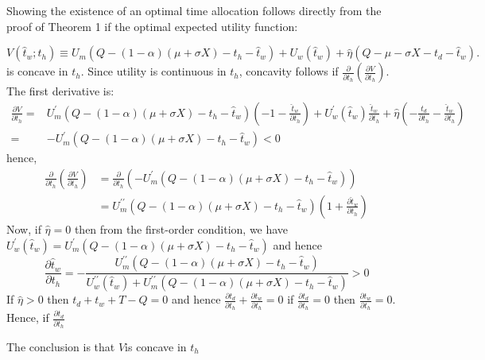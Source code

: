 \documentclass[12pt,a4paper,british]{article}
\theoremstyle{definition}
\theoremstyle{plain}
\theoremstyle{plain}
\begin{document}
Showing the existence of an optimal time allocation follows directly from the proof of Theorem 1 if the optimal expected utility function:

\begin{equation*}
V\left(\hat{t}_{w};t_{h}\right)\equiv U_{m}\left(Q-\left(1-\alpha\right)\left(\mu+\sigma X\right)-t_{h}-\hat{t}_{w}\right)+U_{w}\left(\hat{t}_{w}\right)+\hat{\eta}\left(Q-\mu-\sigma X-t_{d}-\hat{t}_{w}\right).
\end{equation*}%
is concave in $t_{h}$. Since utility is continuous in $t_{h}$, concavity follows if $\frac{\partial}{\partial t_{h}}\left(\frac{\partial V}{\partial t_{h}}\right)$. The first derivative is:
\begin{align*}
\frac{\partial V}{\partial t_{h}}= & U_{m}^{\prime}\left(Q-\left(1-\alpha\right)\left(\mu+\sigma X\right)-t_{h}-\hat{t}_{w}\right)\left(-1-\frac{\hat{t}_{w}}{\partial t_{h}}\right)+U_{w}^{\prime}\left(\hat{t}_{w}\right)\frac{\hat{t}_{w}}{\partial t_{h}}+\hat{\eta}\left(-\frac{t_{d}}{\partial t_{h}}-\frac{\hat{t}_{w}}{\partial t_{h}}\right)\\
= & -U_{m}^{\prime}\left(Q-\left(1-\alpha\right)\left(\mu+\sigma X\right)-t_{h}-\hat{t}_{w}\right)<0
\end{align*}
hence,
\begin{align*}
\frac{\partial}{\partial t_{h}}\left(\frac{\partial V}{\partial t_{h}}\right) & =\frac{\partial}{\partial t_{h}}\left(-U_{m}^{\prime}\left(Q-\left(1-\alpha\right)\left(\mu+\sigma X\right)-t_{h}-\hat{t}_{w}\right)\right)\\
 & =U_{m}^{\prime\prime}\left(Q-\left(1-\alpha\right)\left(\mu+\sigma X\right)-t_{h}-\hat{t}_{w}\right)\left(1+\frac{\partial\hat{t}_{w}}{\partial t_{h}}\right)
\end{align*}
Now, if $\hat{\eta}=0$ then from the first-order condition, we have $U_{w}^{\prime}\left(\hat{t}_{w}\right)=U_{m}^{\prime}\left(Q-\left(1-\alpha\right)\left(\mu+\sigma X\right)-t_{h}-\hat{t}_{w}\right)$ and hence
\begin{equation*}
\frac{\partial\hat{t}_{w}}{\partial t_{h}}=-\frac{U_{m}^{\prime\prime}\left(Q-\left(1-\alpha\right)\left(\mu+\sigma X\right)-t_{h}-\hat{t}_{w}\right)}{U_{w}^{\prime\prime}\left(\hat{t}_{w}\right)+U_{m}^{\prime\prime}\left(Q-\left(1-\alpha\right)\left(\mu+\sigma X\right)-t_{h}-\hat{t}_{w}\right)}>0
\end{equation*}
If $\hat{\eta}>0$ then $t_{d}+t_{w}+T-Q=0$ and hence $\frac{\partial t_{d}}{\partial t_{h}}+\frac{\partial t_{w}}{\partial t_{h}}=0$ if $\frac{\partial t_{d}}{\partial t_{h}}=0$ then $\frac{\partial t_{w}}{\partial t_{h}}=0$. Hence, if $\frac{\partial t_{d}}{\partial t_{h}}$

The conclusion is that $V$is concave in $t_{h}$
\end{document}
